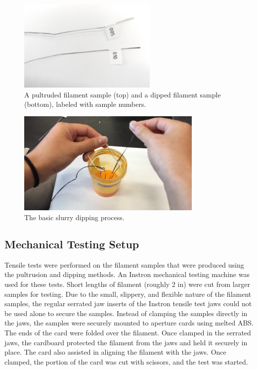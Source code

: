 \begin{figure}[htp]
    \centering
    \includegraphics[width=0.6\textwidth]{./figures/FilamentSample}
    \caption{A pultruded filament sample (top) and a dipped filament sample (bottom), labeled with sample numbers.}
    \label{fig:two-samples}
\end{figure}

\begin{figure}[htp]
    \centering
    \includegraphics[width=0.8\textwidth]{./figures/dipping-vid}
    \caption{The basic slurry dipping process.}
    \label{fig:dipping-vid}
\end{figure}

\subsection{Mechanical Testing Setup}

\indent

Tensile tests were performed on the filament samples that were produced using the pultrusion and dipping methods. An Instron mechanical testing machine was used for these tests. Short lengths of filament (roughly 2 in) were cut from larger samples for testing. Due to the small, slippery,  and flexible nature of the filament samples, the regular serrated jaw inserts of the Instron tensile test jaws could not be used alone to secure the samples. Instead of clamping the samples directly in the jaws, the samples were securely mounted to aperture cards using melted ABS. The ends of the card were folded over the filament. Once clamped in the serrated jaws, the cardboard protected the filament from the jaws and held it securely in place. The card also assisted in aligning the filament with the jaws. Once clamped, the portion of the card was cut with scissors, and the test was started.\\

